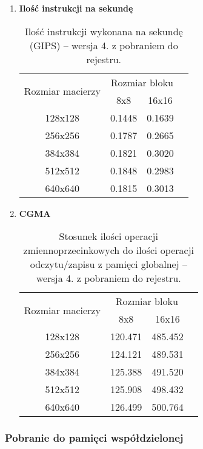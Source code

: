 \begin{enumerate}
\item \textbf{Ilość instrukcji na sekundę} \newline

\begin{table}[H]
\centering
\begin{tabular}{|c|c|c|c|}
\hline
\multirow{2}{*}{Rozmiar macierzy} & \multicolumn{2}{c|}{Rozmiar bloku} \\ \cline{2-3}
& 8x8 & 16x16 \\ \hline
128x128 & 0.1448 & 0.1639 \\ \hline
256x256 & 0.1787 & 0.2665 \\ \hline
384x384 & 0.1821 & 0.3020 \\ \hline
512x512 & 0.1848 & 0.2983 \\ \hline
640x640 & 0.1815 & 0.3013 \\ \hline
\end{tabular}
\caption{Ilość instrukcji wykonana na sekundę (GIPS) -- wersja 4. z pobraniem do rejestru.}
\end{table}

\item \textbf{CGMA} \newline

\begin{table}[H]
\centering
\begin{tabular}{|c|c|c|c|}
\hline
\multirow{2}{*}{Rozmiar macierzy} & \multicolumn{2}{c|}{Rozmiar bloku} \\ \cline{2-3}
& 8x8 & 16x16 \\ \hline
128x128 & 120.471 & 485.452 \\ \hline
256x256 & 124.121 & 489.531 \\ \hline
384x384 & 125.388 & 491.520 \\ \hline
512x512 & 125.908 & 498.432 \\ \hline
640x640 & 126.499 & 500.764 \\ \hline
\end{tabular}
\caption{Stosunek ilości operacji zmiennoprzecinkowych do ilości operacji odczytu/zapisu z pamięci globalnej -- wersja 4. z pobraniem do rejestru.}
\end{table}

\end{enumerate}


\subsubsection{Pobranie do pamięci współdzielonej}

